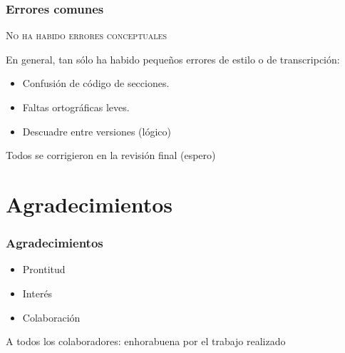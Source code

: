 \documentclass[9pt,xcolor=svgnames]{beamer}
\begin{document}
  \begin{frame}
  \frametitle{Errores comunes}
    \transdissolve
    
  \textsc{No ha habido errores conceptuales}
  
  En general, tan sólo ha habido pequeños errores de estilo o de 
  transcripción:
  
  \begin{itemize}
  \item Confusión de código de secciones.
  \item Faltas ortográficas leves.
  \item Descuadre entre versiones (lógico)
  \end{itemize}
  
  Todos se corrigieron en la revisión final (espero)
  
  \end{frame}
  
  \section{Agradecimientos}
  
  \begin{frame}
  \frametitle{Agradecimientos}
    \transdissolve
    
  \begin{itemize}
  \item Prontitud
  \item Interés
  \item Colaboración
  \end{itemize}
  
  \vspace*{1cm}
  
  A todos los colaboradores: enhorabuena por el trabajo realizado

  \end{frame}
  
 
\end{document}
